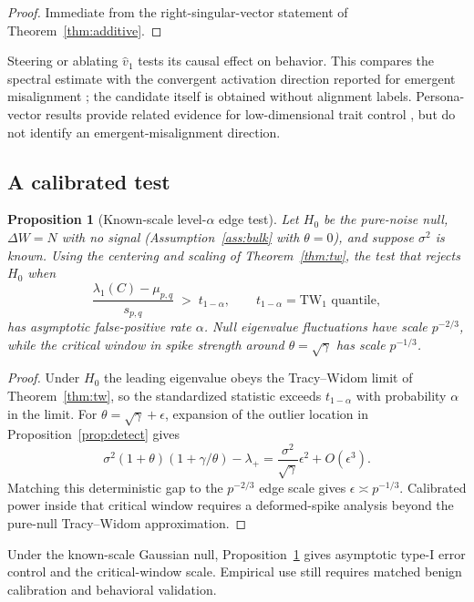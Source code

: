 \documentclass[11pt]{article}
\newtheorem{proposition}[theorem]{Proposition}
\theoremstyle{definition}
\theoremstyle{remark}
\newcommand{\dW}{\Delta W}
\newcommand{\TW}{\mathrm{TW}}
\begin{document}
\begin{proof}
Immediate from the right-singular-vector statement of
Theorem~\ref{thm:additive}.
\end{proof}

Steering or ablating $\hat v_1$ tests its causal effect on behavior. This compares
the spectral estimate with the convergent activation direction reported for
emergent misalignment \cite{soligo2025}; the candidate itself is obtained without
alignment labels. Persona-vector results provide related evidence for
low-dimensional trait control \cite{chen2025}, but do not identify an
emergent-misalignment direction.

\subsection{A calibrated test}

\begin{proposition}[Known-scale level-$\alpha$ edge test]
\label{prop:test}
Let $H_0$ be the pure-noise null, $\dW = N$ with no signal (Assumption~\ref{ass:bulk} with
$\theta = 0$), and suppose $\sigma^2$ is known. Using the centering and scaling of
Theorem~\ref{thm:tw}, the test that rejects $H_0$ when
\[
  \frac{\lambda_1(C) - \mu_{p,q}}{s_{p,q}} \;>\; t_{1-\alpha},
  \qquad t_{1-\alpha} = \TW_1\text{ quantile},
\]
has asymptotic false-positive rate $\alpha$. Null eigenvalue fluctuations have
scale $p^{-2/3}$, while the critical window in spike strength around
$\theta=\sqrt\gamma$ has scale $p^{-1/3}$.
\end{proposition}

\begin{proof}
Under $H_0$ the leading eigenvalue obeys the Tracy--Widom limit of Theorem~\ref{thm:tw},
so the standardized statistic exceeds $t_{1-\alpha}$ with probability $\alpha$ in the
limit. For $\theta=\sqrt\gamma+\epsilon$, expansion of the outlier location in
Proposition~\ref{prop:detect} gives
\[
  \sigma^2(1+\theta)(1+\gamma/\theta)-\lambda_+
  =\frac{\sigma^2}{\sqrt\gamma}\epsilon^2+O(\epsilon^3).
\]
Matching this deterministic gap to the $p^{-2/3}$ edge scale gives
$\epsilon\asymp p^{-1/3}$. Calibrated power inside that critical window requires
a deformed-spike analysis beyond the pure-null Tracy--Widom approximation.
\end{proof}

Under the known-scale Gaussian null, Proposition~\ref{prop:test} gives asymptotic
type-I error control and the critical-window scale. Empirical use still requires
matched benign calibration and behavioral validation.
\end{document}
